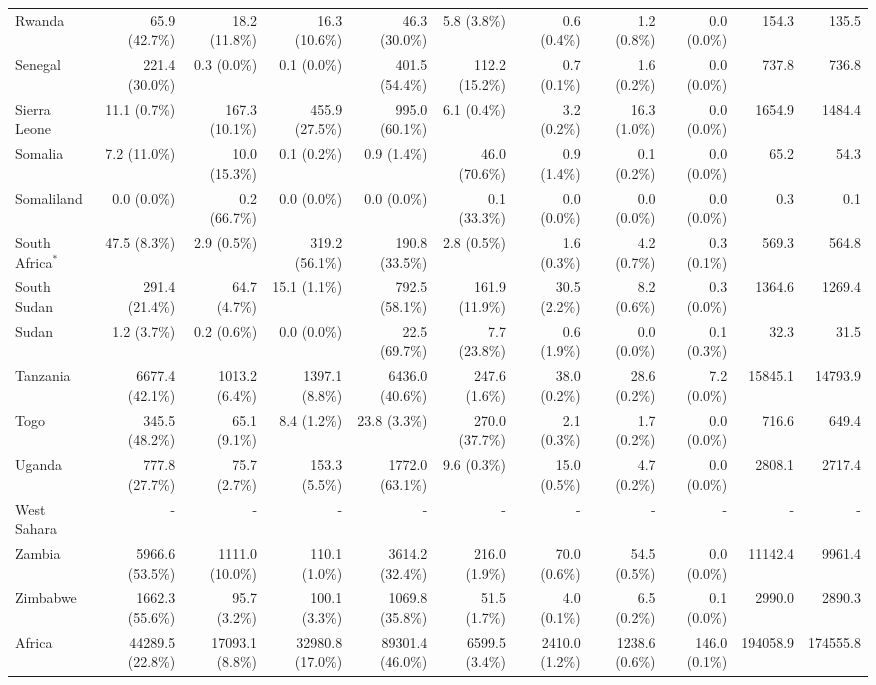 \begin{scriptsize}
\begin{landscape}
\begin{center}
\begin{longtable}[ht]{lrrrrrrrrrr}
			Rwanda&65.9 (42.7\%)&18.2 (11.8\%)&16.3 (10.6\%)&46.3 (30.0\%)&5.8 (3.8\%)&0.6 (0.4\%)&1.2 (0.8\%)&0.0 (0.0\%)&154.3&135.5\\
			Senegal&221.4 (30.0\%)&0.3 (0.0\%)&0.1 (0.0\%)&401.5 (54.4\%)&112.2 (15.2\%)&0.7 (0.1\%)&1.6 (0.2\%)&0.0 (0.0\%)&737.8&736.8\\
			Sierra Leone&11.1 (0.7\%)&167.3 (10.1\%)&455.9 (27.5\%)&995.0 (60.1\%)&6.1 (0.4\%)&3.2 (0.2\%)&16.3 (1.0\%)&0.0 (0.0\%)&1654.9&1484.4\\
			Somalia&7.2 (11.0\%)&10.0 (15.3\%)&0.1 (0.2\%)&0.9 (1.4\%)&46.0 (70.6\%)&0.9 (1.4\%)&0.1 (0.2\%)&0.0 (0.0\%)&65.2&54.3\\
			Somaliland&0.0 (0.0\%)&0.2 (66.7\%)&0.0 (0.0\%)&0.0 (0.0\%)&0.1 (33.3\%)&0.0 (0.0\%)&0.0 (0.0\%)&0.0 (0.0\%)&0.3&0.1\\
			South Africa$^*$&47.5 (8.3\%)&2.9 (0.5\%)&319.2 (56.1\%)&190.8 (33.5\%)&2.8 (0.5\%)&1.6 (0.3\%)&4.2 (0.7\%)&0.3 (0.1\%)&569.3&564.8\\
			South Sudan&291.4 (21.4\%)&64.7 (4.7\%)&15.1 (1.1\%)&792.5 (58.1\%)&161.9 (11.9\%)&30.5 (2.2\%)&8.2 (0.6\%)&0.3 (0.0\%)&1364.6&1269.4\\
			Sudan&1.2 (3.7\%)&0.2 (0.6\%)&0.0 (0.0\%)&22.5 (69.7\%)&7.7 (23.8\%)&0.6 (1.9\%)&0.0 (0.0\%)&0.1 (0.3\%)&32.3&31.5\\
			Tanzania&6677.4 (42.1\%)&1013.2 (6.4\%)&1397.1 (8.8\%)&6436.0 (40.6\%)&247.6 (1.6\%)&38.0 (0.2\%)&28.6 (0.2\%)&7.2 (0.0\%)&15845.1&14793.9\\
			Togo&345.5 (48.2\%)&65.1 (9.1\%)&8.4 (1.2\%)&23.8 (3.3\%)&270.0 (37.7\%)&2.1 (0.3\%)&1.7 (0.2\%)&0.0 (0.0\%)&716.6&649.4\\
			Uganda&777.8 (27.7\%)&75.7 (2.7\%)&153.3 (5.5\%)&1772.0 (63.1\%)&9.6 (0.3\%)&15.0 (0.5\%)&4.7 (0.2\%)&0.0 (0.0\%)&2808.1&2717.4\\
			West Sahara&-&-&-&-&-&-&-&-&-&-\\
			Zambia&5966.6 (53.5\%)&1111.0 (10.0\%)&110.1 (1.0\%)&3614.2 (32.4\%)&216.0 (1.9\%)&70.0 (0.6\%)&54.5 (0.5\%)&0.0 (0.0\%)&11142.4&9961.4\\
			Zimbabwe&1662.3 (55.6\%)&95.7 (3.2\%)&100.1 (3.3\%)&1069.8 (35.8\%)&51.5 (1.7\%)&4.0 (0.1\%)&6.5 (0.2\%)&0.1 (0.0\%)&2990.0&2890.3\\\hline
			Africa&44289.5 (22.8\%)&17093.1 (8.8\%)&32980.8 (17.0\%)&89301.4 (46.0\%)&6599.5 (3.4\%)&2410.0 (1.2\%)&1238.6 (0.6\%)&146.0 (0.1\%)&194058.9&174555.8\\\hline


\end{longtable}
\end{center}
\end{landscape}
\end{scriptsize}
